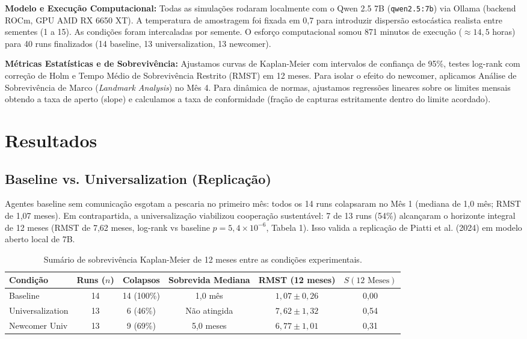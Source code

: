 ﻿\documentclass[11pt,a4paper]{article}
\begin{document}
\textbf{Modelo e Execução Computacional:} Todas as simulações rodaram localmente com o Qwen 2.5 7B (\texttt{qwen2.5:7b}) via Ollama (backend ROCm, GPU AMD RX 6650 XT). A temperatura de amostragem foi fixada em 0,7 para introduzir dispersão estocástica realista entre sementes (1 a 15). As condições foram intercaladas por semente. O esforço computacional somou 871 minutos de execução ($\approx 14,5$ horas) para 40 runs finalizados (14 baseline, 13 universalization, 13 newcomer).

\textbf{Métricas Estatísticas e de Sobrevivência:} Ajustamos curvas de Kaplan-Meier com intervalos de confiança de 95\%, testes log-rank com correção de Holm e Tempo Médio de Sobrevivência Restrito (RMST) em 12 meses. Para isolar o efeito do newcomer, aplicamos Análise de Sobrevivência de Marco (\textit{Landmark Analysis}) no Mês 4. Para dinâmica de normas, ajustamos regressões lineares sobre os limites mensais obtendo a taxa de aperto (slope) e calculamos a taxa de conformidade (fração de capturas estritamente dentro do limite acordado).

\section{Resultados}

\subsection{Baseline vs. Universalization (Replicação)}
Agentes baseline sem comunicação esgotam a pescaria no primeiro mês: todos os 14 runs colapsaram no Mês 1 (mediana de 1,0 mês; RMST de 1,07 meses). Em contrapartida, a universalização viabilizou cooperação sustentável: 7 de 13 runs (54\%) alcançaram o horizonte integral de 12 meses (RMST de 7,62 meses, log-rank vs baseline $p = 5,4 \times 10^{-6}$, Tabela 1). Isso valida a replicação de Piatti et al. (2024) em modelo aberto local de 7B.

\begin{table}[h]
\centering
\small
\caption{Sumário de sobrevivência Kaplan-Meier de 12 meses entre as condições experimentais.}
\vspace{0.1cm}
\begin{tabular}{lccccc}
\toprule
\textbf{Condição} & \textbf{Runs ($n$)} & \textbf{Colapsos} & \textbf{Sobrevida Mediana} & \textbf{RMST (12 meses)} & \textbf{$S(12\text{ Meses})$} \\
\midrule
Baseline & 14 & 14 (100\%) & 1,0 mês & $1,07 \pm 0,26$ & 0,00 \\
Universalization & 13 & 6 (46\%) & Não atingida & $7,62 \pm 1,32$ & 0,54 \\
Newcomer Univ & 13 & 9 (69\%) & 5,0 meses & $6,77 \pm 1,01$ & 0,31 \\
\bottomrule
\end{tabular}
\end{table}
\end{document}
